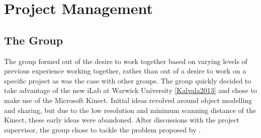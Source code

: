 \chapter{Project Management}
\label{project management}

\section{The Group}
The group formed out of the desire to work together based on varying levels of previous experience working together, rather than out of a desire to work on a specific project as was the case with other groups.
The group quickly decided to take advantage of the new iLab at Warwick University \ref{Kalvala2013} and chose to make use of the Microsoft Kinect.
Initial ideas revolved around object modelling and sharing, but due to the low resolution and minimum scanning distance of the Kinect, these early ideas were abandoned.
After discussions with the project supervisor, the group chose to tackle the problem proposed by .\\

